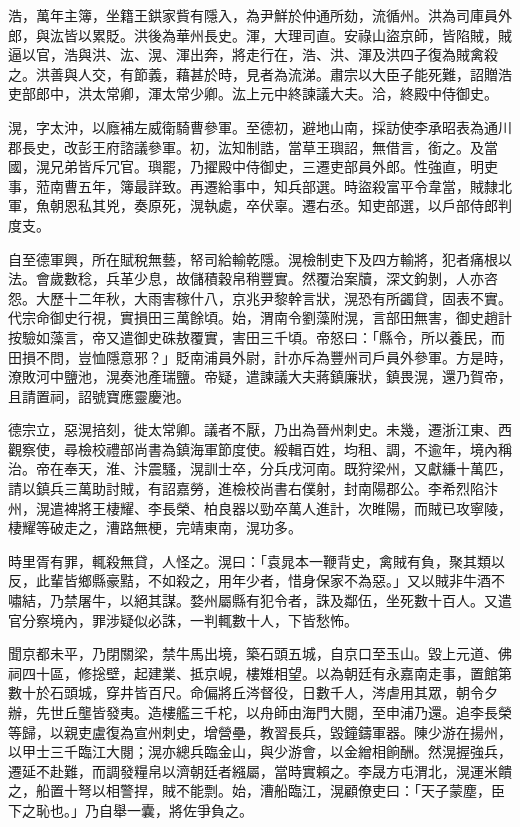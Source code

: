 \begin{pinyinscope}
 浩，萬年主簿，坐籍王鉷家貲有隱入，為尹鮮於仲通所劾，流循州。洪為司庫員外郎，與汯皆以累貶。洪後為華州長史。渾，大理司直。安祿山盜京師，皆陷賊，賊逼以官，浩與洪、汯、滉、渾出奔，將走行在，浩、洪、渾及洪四子復為賊禽殺之。洪善與人交，有節義，藉甚於時，見者為流涕。肅宗以大臣子能死難，詔贈浩吏部郎中，洪太常卿，渾太常少卿。汯上元中終諫議大夫。洽，終殿中侍御史。



 滉，字太沖，以廕補左威衛騎曹參軍。至德初，避地山南，採訪使李承昭表為通川郡長史，改彭王府諮議參軍。初，汯知制誥，當草王璵詔，無借言，銜之。及當國，滉兄弟皆斥冗官。璵罷，乃擢殿中侍御史，三遷吏部員外郎。性強直，明吏事，蒞南曹五年，簿最詳致。再遷給事中，知兵部選。時盜殺富平令韋當，賊隸北軍，魚朝恩私其兇，奏原死，滉執處，卒伏辜。遷右丞。知吏部選，以戶部侍郎判度支。



 自至德軍興，所在賦稅無藝，帑司給輸乾隱。滉檢制吏下及四方輸將，犯者痛根以法。會歲數稔，兵革少息，故儲積穀帛稍豐實。然覆治案牘，深文鉤剝，人亦咨怨。大歷十二年秋，大雨害稼什八，京兆尹黎幹言狀，滉恐有所蠲貸，固表不實。代宗命御史行視，實損田三萬餘頃。始，渭南令劉藻附滉，言部田無害，御史趙計按驗如藻言，帝又遣御史硃敖覆實，害田三千頃。帝怒曰：「縣令，所以養民，而田損不問，豈恤隱意邪？」貶南浦員外尉，計亦斥為豐州司戶員外參軍。方是時，潦敗河中鹽池，滉奏池產瑞鹽。帝疑，遣諫議大夫蔣鎮廉狀，鎮畏滉，還乃賀帝，且請置祠，詔號寶應靈慶池。



 德宗立，惡滉掊刻，徙太常卿。議者不厭，乃出為晉州刺史。未幾，遷浙江東、西觀察使，尋檢校禮部尚書為鎮海軍節度使。綏輯百姓，均租、調，不逾年，境內稱治。帝在奉天，淮、汴震騷，滉訓士卒，分兵戌河南。既狩梁州，又獻縑十萬匹，請以鎮兵三萬助討賊，有詔嘉勞，進檢校尚書右僕射，封南陽郡公。李希烈陷汴州，滉遣裨將王棲耀、李長榮、柏良器以勁卒萬人進計，次睢陽，而賊已攻寧陵，棲耀等破走之，漕路無梗，完靖東南，滉功多。



 時里胥有罪，輒殺無貸，人怪之。滉曰：「袁晁本一鞭背史，禽賊有負，聚其類以反，此輩皆鄉縣豪黠，不如殺之，用年少者，惜身保家不為惡。」又以賊非牛酒不嘯結，乃禁屠牛，以絕其謀。婺州屬縣有犯令者，誅及鄰伍，坐死數十百人。又遣官分察境內，罪涉疑似必誅，一判輒數十人，下皆愁怖。



 聞京都未平，乃閉關梁，禁牛馬出境，築石頭五城，自京口至玉山。毀上元道、佛祠四十區，修捴壁，起建業、抵京峴，樓雉相望。以為朝廷有永嘉南走事，置館第數十於石頭城，穿井皆百尺。命偏將丘涔督役，日數千人，涔虐用其眾，朝令夕辦，先世丘壟皆發夷。造樓艦三千柁，以舟師由海門大閱，至申浦乃還。追李長榮等歸，以親吏盧復為宣州刺史，增營壘，教習長兵，毀鐘鑄軍器。陳少游在揚州，以甲士三千臨江大閱；滉亦總兵臨金山，與少游會，以金繒相餉酬。然滉握強兵，遷延不赴難，而調發糧帛以濟朝廷者繦屬，當時實賴之。李晟方屯渭北，滉運米饋之，船置十弩以相警捍，賊不能剽。始，漕船臨江，滉顧僚吏曰：「天子蒙塵，臣下之恥也。」乃自舉一囊，將佐爭負之。




\end{pinyinscope}

